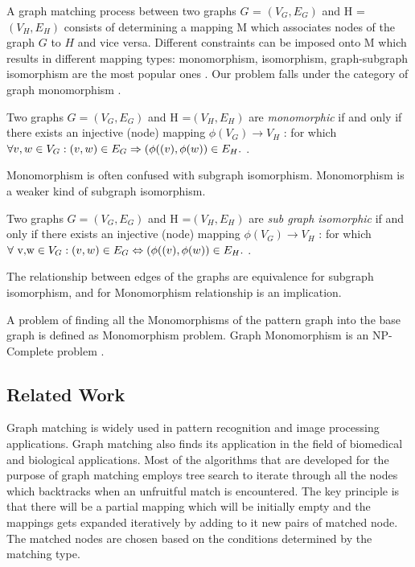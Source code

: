 A graph matching process between two graphs $G$ = $(V_G,E_G)$ and H = $(V_H,E_H)$ consists of determining a mapping M which associates nodes of the graph $G$ to $H$ and vice versa. Different constraints can be imposed onto M which results in different mapping types: monomorphism, isomorphism, graph-subgraph isomorphism are the most popular ones \cite{cordella1999performance}. Our problem falls under the category of graph monomorphism . 

Two graphs 
 $G =( V_G, E_G)$ and
 H =$( V_H, E_H)$  are \textit{monomorphic}  if and only if there exists an injective (node)
mapping $\phi (V_G) \rightarrow  V_H$ : for which $\forall v,w \in V_G:(v,w) \in E_G \Rightarrow (\phi((v),\space \phi(w)) \in E_H.$ \cite{singler2005graph}.

Monomorphism is often confused with subgraph isomorphism. Monomorphism is a weaker kind of subgraph isomorphism.

Two graphs  $G =( V_G, E_G)$ and
 H =$( V_H, E_H)$  are \textit{sub graph isomorphic}  if and only if there exists an injective (node)
mapping $\phi( V_G) \rightarrow  V_H$ : for which $\forall \text{ v,w} \in V_G:(v,w) \in E_G \Leftrightarrow (\phi((v),\space \phi(w)) \in E_H.$ \cite{singler2005graph}.

The relationship between edges of the graphs are equivalence for subgraph isomorphism, and for Monomorphism  relationship  is an implication.

A problem of finding all the Monomorphisms of the pattern graph into the base graph is defined as Monomorphism problem. Graph Monomorphism is an NP-Complete problem \cite{Garey:1979:CIG:578533}. 
\subsection{Related Work}

Graph matching is widely used in pattern recognition and image processing applications. Graph matching also finds its application in the field of biomedical and biological applications. 
Most of the algorithms that are developed for the purpose of graph matching employs tree search to iterate through all the nodes which backtracks when an unfruitful match is encountered.
The key principle is that there will be a partial mapping which will be initially empty and the mappings gets expanded iteratively by adding to it new pairs of matched node. The matched nodes are chosen based on the conditions determined by the matching type.


